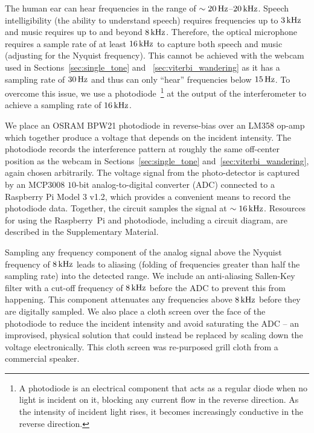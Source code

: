 \documentclass[paper-main.tex]{subfiles}
\begin{document}
The human ear can hear frequencies in the range of $\sim 20\,{\rm Hz}$--$20\,{\rm kHz}$. 
Speech intelligibility (the ability to understand speech) requires frequencies up to $3\,{\rm kHz}$ and music requires up to and beyond $8\,{\rm kHz}$. 
Therefore, the optical microphone requires a sample rate of at least $16\,{\rm kHz}$ to capture both speech and music (adjusting for the Nyquist frequency). 
This cannot be achieved with the webcam used in Sections~\ref{sec:single_tone} and ~\ref{sec:viterbi_wandering} as it has a sampling rate of $30\,{\rm Hz}$ and thus can only ``hear'' frequencies below $15\,{\rm Hz}$.
To overcome this issue, we use a photodiode~\footnote{A photodiode is an electrical component that acts as a regular diode when no light is incident on it, blocking any current flow in the reverse direction. As the intensity of incident light rises, it becomes increasingly conductive in the reverse direction.} at the output of the interferometer to achieve a sampling rate of $16\,{\rm kHz}$.


We place an OSRAM BPW21 photodiode in reverse-bias over an LM358 op-amp which together produce a voltage that depends on the incident intensity. 
The photodiode records the interference pattern at roughly the same off-center position as the webcam in Sections~\ref{sec:single_tone} and~\ref{sec:viterbi_wandering}, again chosen arbitrarily. 
The voltage signal from the photo-detector is captured by an MCP3008 $10$-bit analog-to-digital converter (ADC) connected to a Raspberry Pi Model 3 v1.2, which provides a convenient means to record the photodiode data.
Together, the circuit samples the signal at $\sim 16\,{\rm kHz}$. 
Resources for using the Raspberry~Pi and photodiode, including a circuit diagram, are described in the Supplementary Material.

Sampling any frequency component of the analog signal above the Nyquist frequency of $8\,{\rm kHz}$ leads to aliasing (folding of frequencies greater than half the sampling rate) into the detected range. We include an anti-aliasing Sallen-Key filter with a cut-off frequency of $8\,{\rm kHz}$ before the ADC to prevent this from happening. 
This component attenuates any frequencies above $8\,{\rm kHz}$ before they are digitally sampled. We also place a cloth screen over the face of the photodiode to reduce the incident intensity and avoid saturating the ADC -- an improvised, physical solution that could instead be replaced by scaling down the voltage electronically. This cloth screen was re-purposed grill cloth from a commercial speaker.
\end{document}
